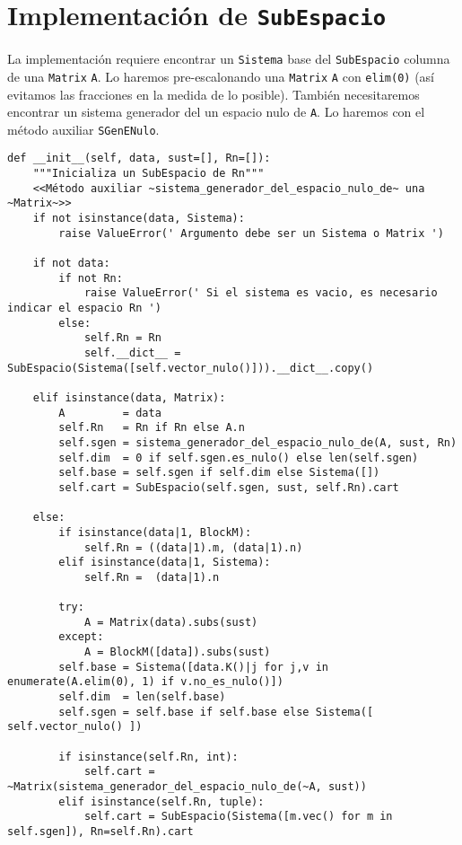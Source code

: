 \documentclass[11pt]{report}
\begin{document}
\section{Implementación de \texttt{SubEspacio}}
\label{sec:org6c77a95}

La implementación requiere encontrar un \texttt{Sistema} base del
\texttt{SubEspacio} columna de una \texttt{Matrix} \texttt{A}. Lo haremos pre-escalonando
una \texttt{Matrix} \texttt{A} con \texttt{elim(0)} (así evitamos las fracciones en la medida
de lo posible). También necesitaremos encontrar un sistema generador
del un espacio nulo de \texttt{A}. Lo haremos con el método auxiliar
\texttt{SGenENulo}.

\begin{verbatim}
def __init__(self, data, sust=[], Rn=[]):
    """Inicializa un SubEspacio de Rn"""
    <<Método auxiliar ~sistema_generador_del_espacio_nulo_de~ una ~Matrix~>>
    if not isinstance(data, Sistema):
        raise ValueError(' Argumento debe ser un Sistema o Matrix ')
    
    if not data:
        if not Rn:
            raise ValueError(' Si el sistema es vacio, es necesario indicar el espacio Rn ')
        else:
            self.Rn = Rn
            self.__dict__ = SubEspacio(Sistema([self.vector_nulo()])).__dict__.copy()
        
    elif isinstance(data, Matrix):
        A         = data
        self.Rn   = Rn if Rn else A.n
        self.sgen = sistema_generador_del_espacio_nulo_de(A, sust, Rn)
        self.dim  = 0 if self.sgen.es_nulo() else len(self.sgen)
        self.base = self.sgen if self.dim else Sistema([])
        self.cart = SubEspacio(self.sgen, sust, self.Rn).cart

    else:
        if isinstance(data|1, BlockM):
            self.Rn = ((data|1).m, (data|1).n)
        elif isinstance(data|1, Sistema):
            self.Rn =  (data|1).n
            
        try:
            A = Matrix(data).subs(sust)
        except:
            A = BlockM([data]).subs(sust)
        self.base = Sistema([data.K()|j for j,v in enumerate(A.elim(0), 1) if v.no_es_nulo()])
        self.dim  = len(self.base)
        self.sgen = self.base if self.base else Sistema([ self.vector_nulo() ])
        
        if isinstance(self.Rn, int):
            self.cart = ~Matrix(sistema_generador_del_espacio_nulo_de(~A, sust))
        elif isinstance(self.Rn, tuple):
            self.cart = SubEspacio(Sistema([m.vec() for m in self.sgen]), Rn=self.Rn).cart
    
\end{verbatim}
\end{document}
